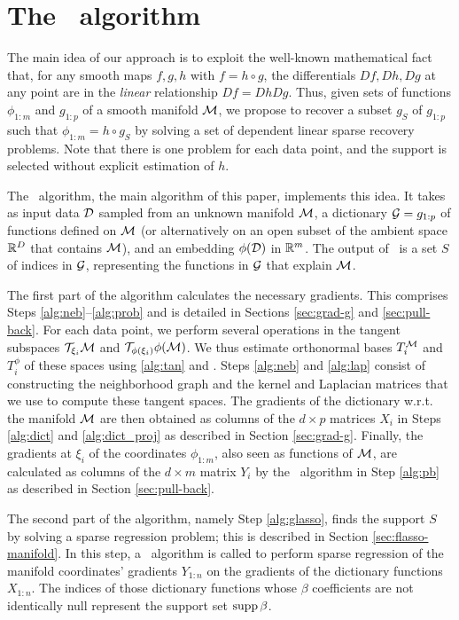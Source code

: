 \section{The \ouralg~algorithm}
\label{sec:ouralg}
The main idea of our approach is to exploit the well-known mathematical fact that, for any smooth maps $f,g,h$ with
$f =h\circ g$, the differentials $Df,Dh,Dg$ at any point are in
the {\em linear} relationship $Df = Dh Dg$. 
Thus, given sets of functions $\phi_{1:m}$ and $g_{1:p}$ of a smooth manifold ${\cal M}$, we propose to recover a subset $g_{S}$ of $g_{1:p}  $ such that $\phi_{1:m} =h \circ g_S$ by solving a set of dependent linear sparse recovery problems.
Note that there is one problem for each data point, and the support is selected without explicit estimation of $h$.

The \ouralg~algorithm, the main algorithm of this paper, implements this idea.
It takes as input data ${\cal D}$ sampled from an unknown manifold ${\cal M}$, a dictionary ${\cal G}  = g_{1:p}$ of functions defined on ${\cal M}$ (or alternatively on an open subset of the ambient space ${\mathbb R}^D$ that contains ${\cal M}$), and an embedding $\phi({\cal D})$ in
${\mathbb R}^m$.
The output of \ouralg~is a set $S$ of indices in ${\cal G}$,
representing the functions in ${\cal G}$ that explain ${\cal M}$. 

The first part of the algorithm calculates the necessary gradients.
This comprises Steps \ref{alg:neb}--\ref{alg:prob} and is detailed in Sections \ref{sec:grad-g} and \ref{sec:pull-back}.
For each data point, we perform several operations in the tangent subspaces ${\cal T}_{\xi_i}{\cal M}$ and ${\cal T}_{\phi(\xi_i)} \phi ({\cal M})$.
We thus estimate orthonormal bases $T_i^{\cal M}$ and $T_i^\phi$ of these spaces using \ref{alg:tan} and \rmalg.  
Steps \ref{alg:neb} and \ref{alg:lap} consist of constructing the neighborhood graph and the kernel and Laplacian matrices that we use to compute these tangent spaces.
The gradients of the dictionary w.r.t. the manifold ${\cal M}$ are then obtained as columns of the $d\times p$ matrices $X_i$ in Steps \ref{alg:dict} and \ref{alg:dict_proj} as described in Section \ref{sec:grad-g}.
Finally, the gradients at $\xi_i$ of the coordinates $\phi_{1:m}$, also seen as functions of ${\cal M}$, are calculated as columns of the $d \times m $ matrix $Y_i$ by the \dpullalg~algorithm in Step \ref{alg:pb} as described in Section \ref{sec:pull-back}. 

The second part of the algorithm, namely Step \ref{alg:glasso}, finds the support $S$ by solving a sparse regression problem; this is described in Section \ref{sec:flasso-manifold}.
In this step, a \flassoalg~algorithm is called to perform sparse regression of the manifold coordinates' gradients $Y_{1:n}$ on the gradients of the dictionary functions $X_{1:n}$.
The indices of those dictionary functions whose $\beta$ coefficients are not identically null represent the support set $\operatorname{supp} \beta$.

